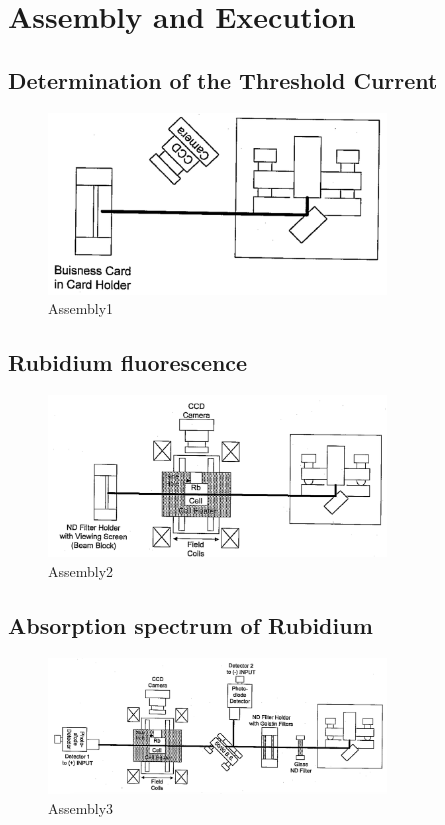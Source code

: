 \section{Assembly and Execution}
\label{sec:Durchfuehrung}
\subsection{Determination of the Threshold Current}
\begin{figure}
    \center
    \includegraphics[width=0.8\textwidth]{bilder/Assembly_1.png}
    \caption{Assembly1 \cite{anleitung}}
    \label{fig:assembly1}
\end{figure}
\subsection{Rubidium fluorescence}
\begin{figure}
    \center
    \includegraphics[width=0.8\textwidth]{bilder/Assembly_2.png}
    \caption{Assembly2 \cite{anleitung}}
    \label{fig:assembly2}
\end{figure}
\subsection{Absorption spectrum of Rubidium}
\begin{figure}
    \center
    \includegraphics[width=0.8\textwidth]{bilder/Assembly_3.png}
    \caption{Assembly3 \cite{anleitung}}
    \label{fig:assembly3}
\end{figure}